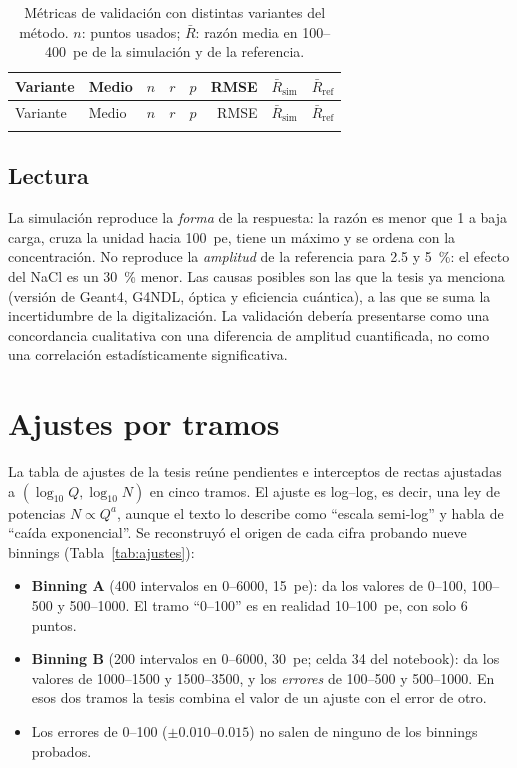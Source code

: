 \documentclass[11pt,a4paper]{article}
\newcommand{\tablas}{tablas}
\begin{document}
{\small\setlength{\tabcolsep}{4pt}
\begin{longtable}{@{}llrrrrrr@{}}
\caption{Métricas de validación con distintas variantes del método. $n$: puntos usados; $\bar R$: razón media en 100--400~pe de la simulación y de la referencia.}
\label{tab:variantes}\\
\toprule
Variante & Medio & $n$ & $r$ & $p$ & RMSE & $\bar R_\text{sim}$ & $\bar R_\text{ref}$ \\
\midrule
\endfirsthead
\toprule
Variante & Medio & $n$ & $r$ & $p$ & RMSE & $\bar R_\text{sim}$ & $\bar R_\text{ref}$ \\
\midrule
\endhead
 \\
\bottomrule
\end{longtable}}

\subsection{Lectura}

La simulación reproduce la \emph{forma} de la respuesta: la razón es menor que 1 a baja carga, cruza la unidad hacia 100~pe, tiene un máximo y se ordena con la concentración. No reproduce la \emph{amplitud} de la referencia para 2.5 y 5~\%: el efecto del NaCl es un 30~\% menor. Las causas posibles son las que la tesis ya menciona (versión de Geant4, G4NDL, óptica y eficiencia cuántica), a las que se suma la incertidumbre de la digitalización. La validación debería presentarse como una concordancia cualitativa con una diferencia de amplitud cuantificada, no como una correlación estadísticamente significativa.

\section{Ajustes por tramos}
\label{sec:ajustes}

La tabla de ajustes de la tesis reúne pendientes e interceptos de rectas ajustadas a $(\log_{10}Q,\log_{10}N)$ en cinco tramos. El ajuste es log--log, es decir, una ley de potencias $N\propto Q^{a}$, aunque el texto lo describe como ``escala semi-log'' y habla de ``caída exponencial''. Se reconstruyó el origen de cada cifra probando nueve binnings (Tabla~\ref{tab:ajustes}):
\begin{itemize}
  \item \textbf{Binning A} (400 intervalos en 0--6000, 15~pe): da los valores de 0--100, 100--500 y 500--1000. El tramo ``0--100'' es en realidad 10--100~pe, con solo 6 puntos.
  \item \textbf{Binning B} (200 intervalos en 0--6000, 30~pe; celda 34 del notebook): da los valores de 1000--1500 y 1500--3500, y los \emph{errores} de 100--500 y 500--1000. En esos dos tramos la tesis combina el valor de un ajuste con el error de otro.
  \item Los errores de 0--100 ($\pm0.010$--$0.015$) no salen de ninguno de los binnings probados.
\end{itemize}
\end{document}
